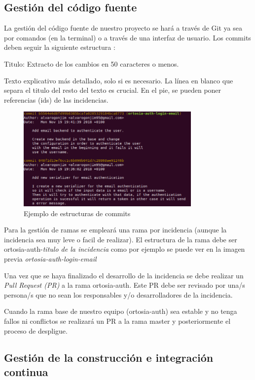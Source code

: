 \documentclass[12pt]{article}
\begin{document}
\subsection{Gestión del código fuente}
La gestión del código fuente de nuestro proyecto se hará a través de Git ya sea por comandos (en la terminal) o a través de una interfaz de usuario. 
Los commits deben seguir la siguiente estructura \cite{commit-structure}:

Titulo: Extracto de los cambios en 50 caracteres o menos.

Texto explicativo más detallado, solo si es necesario. La línea en blanco que separa el titulo del resto del texto es crucial.
En el pie, se pueden poner referencias (ids) de las incidencias.

\begin{figure}[h]
\centering
\includegraphics[width=0.8\textwidth]{commits.png}
\caption{Ejemplo de estructuras de commits}
\end{figure}


Para la gestión de ramas se empleará una rama por incidencia (aunque la incidencia sea muy leve o facil de realizar). El estructura de la rama debe ser ortosia-auth-\emph{titulo de la incidencia} como por ejemplo se puede ver en la imagen previa \emph{ortosia-auth-login-email}

Una vez que se haya finalizado el desarrollo de la incidencia se debe realizar un \emph{Pull Request (PR)} a la rama ortosia-auth. Este PR debe ser revisado por una/s persona/s que no sean los responsables y/o desarrolladores de la incidencia.

Cuando la rama base de nuestro equipo (ortosia-auth) sea estable y no tenga  fallos ni conflictos se realizará un PR a la rama master y posteriormente el proceso de despligue. 

\subsection{Gestión de la construcción e integración continua}
\end{document}
